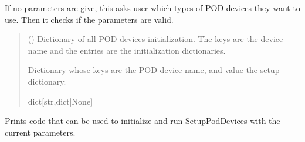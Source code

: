 \documentclass[letterpaper,10pt,english]{sphinxmanual}
\begin{document}
\begin{fulllineitems}
\begin{fulllineitems}
\label{\detokenize{Setup_PodDevices:Setup_PodDevices.Setup_PodDevices._GetParams}}
\pysigstartsignatures
{}
\pysigstopsignatures
\sphinxAtStartPar
If no parameters are give, this asks user which types of POD devices they want to use.         Then it checks if the parameters are valid.
\begin{quote}\begin{description}
\sphinxAtStartPar
{} (\sphinxstyleliteralemphasis{\sphinxupquote{ | }}\sphinxstyleliteralemphasis{\sphinxupquote{{[}}}\sphinxstyleliteralemphasis{\sphinxupquote{,}}\sphinxstyleliteralemphasis{\sphinxupquote{{]}}}) \textendash{} Dictionary of all POD devices initialization.                 The keys are the device name and the entries are the initialization dictionaries.

\sphinxAtStartPar
Dictionary whose keys are the POD device name, and value the setup                 dictionary.

\sphinxAtStartPar
dict{[}str,dict|None{]}

\end{description}\end{quote}

\end{fulllineitems}


\begin{fulllineitems}
\label{\detokenize{Setup_PodDevices:Setup_PodDevices.Setup_PodDevices._PrintInitCode}}
\pysigstartsignatures
{}
\pysigstopsignatures
\sphinxAtStartPar
Prints code that can be used to initialize and run SetupPodDevices with the         current parameters.


\end{fulllineitems}
\end{fulllineitems}
\end{document}
